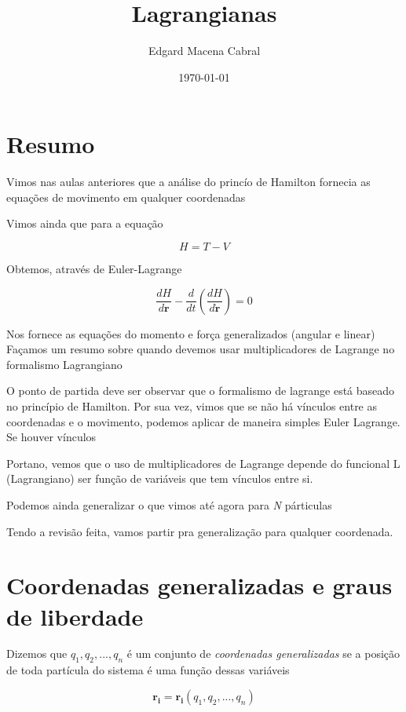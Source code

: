 \documentclass[11pt]{article}
\author{Edgard Macena Cabral}
\date{\today}
\title{Lagrangianas}
\begin{document}
\maketitle
\tableofcontents




\section{Resumo}
\label{sec:orgf46399d}
Vimos nas aulas anteriores que a análise do princío de Hamilton fornecia as equações de movimento em qualquer coordenadas

Vimos ainda que para a equação

\begin{equation}
 H = T - V
\end{equation}

Obtemos, através de Euler-Lagrange

\begin{equation}\label{eq:Euler-Lagrange}
\frac{dH}{d\mathbf{r}} - \frac{d}{dt}\left(\dfrac{dH}{d\mathbf{\dot{r}}}\right) = 0
\end{equation}

Nos fornece as equações do momento e força generalizados (angular e linear)
Façamos um resumo sobre quando devemos usar multiplicadores de Lagrange no
formalismo Lagrangiano

O ponto de partida deve ser observar que o formalismo de lagrange está
baseado no princípio de Hamilton. Por sua vez, vimos que se não há vínculos
entre as coordenadas e o movimento, podemos aplicar de maneira simples Euler
Lagrange. Se houver vínculos

Portano, vemos que o uso de multiplicadores de Lagrange depende do funcional
L (Lagrangiano) ser função de variáveis que tem vínculos entre si.

Podemos ainda generalizar o que vimos até agora para \emph{N} párticulas

Tendo a revisão feita, vamos partir pra generalização para qualquer
coordenada.


\section{Coordenadas generalizadas e graus de liberdade}
\label{sec:org341ec19}
Dizemos que \(q_1, q_2, ..., q_n\) é um conjunto de \emph{coordenadas generalizadas} se
a posição de toda partícula do sistema é uma função dessas variáveis

\begin{equation}\label{eq:coordenadas generalizadas}
\mathbf{r_i} = \mathbf{r_i}(q_1, q_2, ..., q_n)
\end{equation}
\end{document}
